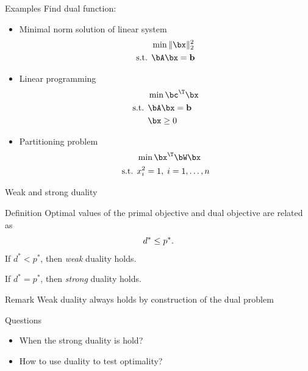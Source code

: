 \documentclass[12pt]{beamer}
\begin{document}
\begin{frame}{Examples}
Find dual function:
\begin{itemize}
\item Minimal norm solution of linear system 
\vspace{-3mm}
\begin{equation*}
\begin{split}
& \min \| \bx\|^2_2\\
\text{s.t. } & \bA\bx = \mathbf{b}
\end{split}
\end{equation*}
\item Linear programming
\vspace{-3mm}
\begin{equation*}
\begin{split}
& \min \bc^{\T}\bx\\
\text{s.t. } & \bA\bx = \mathbf{b}\\
& \bx \geq 0
\end{split}
\end{equation*}
\item Partitioning problem
\vspace{-3mm}
\begin{equation*}
\begin{split}
& \min \bx^{\T}\bW\bx\\
\text{s.t. } & x^2_i = 1, \; i = 1,\ldots,n
\end{split}
\end{equation*}
\end{itemize}
\end{frame}

\begin{frame}{Weak and strong duality}
\small
\begin{block}{Definition}
Optimal values of the primal objective and dual objective are related as 
\[
d^* \leq p^*.
\vspace{-2mm}
\]
If $d^* < p^*$, then \emph{weak} duality holds.

If $d^* = p^*$, then \emph{strong} duality holds.
\end{block}

\begin{block}{Remark}
Weak duality always holds by construction of the dual problem
\end{block}

\begin{block}{Questions}
\begin{itemize}
\item When the strong duality is hold?
\vspace{-3mm}
\item How to use duality to test optimality?
\end{itemize}
\end{block}
\end{frame}
\end{document}
